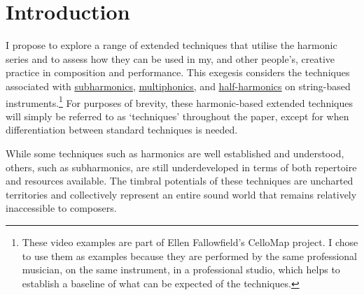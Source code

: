 \section{Introduction}


\doublespace{}

I propose to explore a range of extended techniques that utilise the harmonic series and to assess how they can be used in my, and other people's, creative practice in composition and performance. 
This exegesis considers the techniques associated with \underline{\textcolor{blue}{\href{https://vimeo.com/57219720}{subharmonics}}}, \underline{\textcolor{blue}{\href{https://vimeo.com/81380931}{multiphonics}}}, and \underline{\textcolor{blue}{\href{https://vimeo.com/92221539}{half-harmonics}}} on string-based instruments.\footnote{These video examples are part of Ellen Fallowfield's CelloMap project. I chose to use them as examples because they are performed by the same professional musician, on the same instrument, in a professional studio, which helps to establish a baseline of what can be expected of the techniques.}
For purposes of brevity, these harmonic-based extended techniques will simply be referred to as `techniques' throughout the paper, except for when differentiation between standard techniques is needed.

While some techniques such as harmonics are well established and understood, others, such as subharmonics, are still underdeveloped in terms of both repertoire and resources available. 
The timbral potentials of these techniques are uncharted territories and collectively represent an entire sound world that remains relatively inaccessible to composers.



